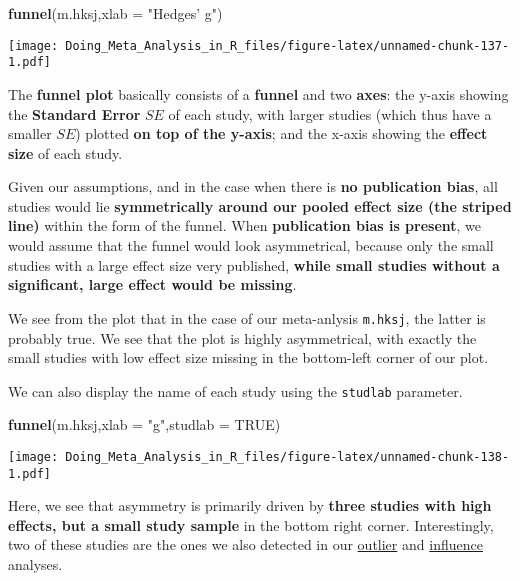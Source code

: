\documentclass[]{book}
\newenvironment{Shaded}{\begin{snugshade}}{\end{snugshade}}
\newcommand{\KeywordTok}[1]{\textcolor[rgb]{0.13,0.29,0.53}{\textbf{#1}}}
\newcommand{\DataTypeTok}[1]{\textcolor[rgb]{0.13,0.29,0.53}{#1}}
\newcommand{\StringTok}[1]{\textcolor[rgb]{0.31,0.60,0.02}{#1}}
\newcommand{\OtherTok}[1]{\textcolor[rgb]{0.56,0.35,0.01}{#1}}
\newcommand{\NormalTok}[1]{#1}
\theoremstyle{definition}
\theoremstyle{definition}
\theoremstyle{definition}
\theoremstyle{remark}
\begin{document}
\begin{Shaded}
\begin{Highlighting}[]
\KeywordTok{funnel}\NormalTok{(m.hksj,}\DataTypeTok{xlab =} \StringTok{"Hedges' g"}\NormalTok{)}
\end{Highlighting}
\end{Shaded}

\texttt{[image: Doing\_Meta\_Analysis\_in\_R\_files/figure-latex/unnamed-chunk-137-1.pdf]}

The \textbf{funnel plot} basically consists of a \textbf{funnel} and two
\textbf{axes}: the y-axis showing the \textbf{Standard Error} \(SE\) of
each study, with larger studies (which thus have a smaller \(SE\))
plotted \textbf{on top of the y-axis}; and the x-axis showing the
\textbf{effect size} of each study.

Given our assumptions, and in the case when there is \textbf{no
publication bias}, all studies would lie \textbf{symmetrically around
our pooled effect size (the striped line)} within the form of the
funnel. When \textbf{publication bias is present}, we would assume that
the funnel would look asymmetrical, because only the small studies with
a large effect size very published, \textbf{while small studies without
a significant, large effect would be missing}.

We see from the plot that in the case of our meta-anlysis
\texttt{m.hksj}, the latter is probably true. We see that the plot is
highly asymmetrical, with exactly the small studies with low effect size
missing in the bottom-left corner of our plot.

We can also display the name of each study using the \texttt{studlab}
parameter.

\begin{Shaded}
\begin{Highlighting}[]
\KeywordTok{funnel}\NormalTok{(m.hksj,}\DataTypeTok{xlab =} \StringTok{"g"}\NormalTok{,}\DataTypeTok{studlab =} \OtherTok{TRUE}\NormalTok{)}
\end{Highlighting}
\end{Shaded}

\texttt{[image: Doing\_Meta\_Analysis\_in\_R\_files/figure-latex/unnamed-chunk-138-1.pdf]}

Here, we see that asymmetry is primarily driven by \textbf{three studies
with high effects, but a small study sample} in the bottom right corner.
Interestingly, two of these studies are the ones we also detected in our
\protect\hyperlink{outliers}{outlier} and
\protect\hyperlink{influenceanalyses}{influence} analyses.
\end{document}

